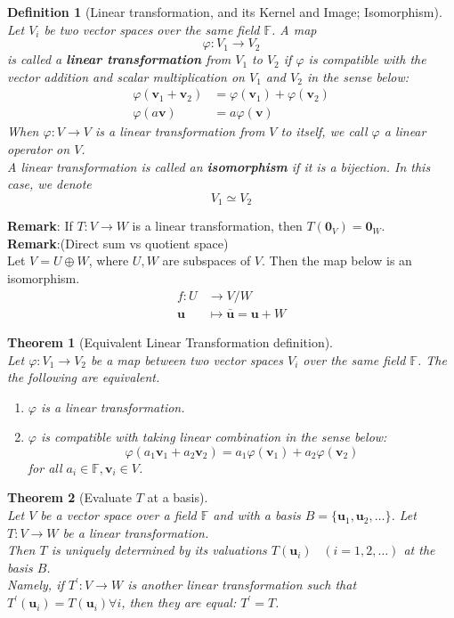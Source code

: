 \documentclass[12pt]{article}
\newtheorem{definition}{Definition}[section]
\newtheorem{theorem}{Theorem}[section]
\theoremstyle{definition}
\begin{document}
\begin{definition}[Linear transformation, and its Kernel and Image; Isomorphism]
\hfill\\\normalfont Let $V_i$ be two vector spaces over the same field $\mathbb{F}$. A map
\[
\varphi:V_1\to V_2
\]
is called a \textbf{linear transformation} from $V_1$ to $V_2$ if $\varphi$ is compatible with the vector addition and scalar multiplication on $V_1$ and $V_2$ in the sense below:
\[
\begin{aligned}
\varphi(\mathbf{v}_1+\mathbf{v}_2)&=\varphi(\mathbf{v}_1)+\varphi(\mathbf{v}_2)\\
\varphi(a\mathbf{v})&=a\varphi(\mathbf{v})
\end{aligned}
\]
When $\varphi:V\to V$ is a linear transformation from $V$ to itself, we call $\varphi$ a linear operator on $V$.\\
A linear transformation is called an \textbf{isomorphism} if it is a bijection. In this case, we denote
\[
V_1\simeq V_2
\]
\end{definition}
\textbf{Remark}: If $T:V\to W$ is a linear transformation, then $T(\mathbf{0}_V)=\mathbf{0}_W$.\\
\textbf{Remark}:(Direct sum vs quotient space)\\
Let $V = U\oplus W$, where $U, W$ are subspaces of $V$. Then the map below is an isomorphism.
\[
\begin{aligned}
f:U&\to V/W\\
\mathbf{u}&\mapsto \bar{\mathbf{u}}=\mathbf{u}+W
\end{aligned}
\]
\begin{theorem}[Equivalent Linear Transformation definition]
\hfill\\\normalfont Let $\varphi:V_1\to V_2$ be a map between two vector spaces $V_i$ over the same field $\mathbb{F}$. The the following are equivalent.
\begin{enumerate}[label=(\arabic*)]
\item $\varphi$ is a linear transformation.
\item $\varphi$ is compatible with taking linear combination in the sense below:
\[
\varphi(a_1\mathbf{v}_1+a_2\mathbf{v}_2)=a_1\varphi(\mathbf{v}_1)+a_2\varphi(\mathbf{v}_2)
\]
for all $a_i\in \mathbb{F},\mathbf{v}_i\in V$.
\end{enumerate}
\end{theorem}
\begin{theorem}[Evaluate $T$ at a basis]
\hfill\\\normalfont Let $V$ be a vector space over a field $\mathbb{F}$ and with a basis $B=\{\mathbf{u}_1,\mathbf{u}_2,\ldots\}$. Let $T:V\to W$ be a linear transformation. \\
Then $T$ is uniquely determined by its valuations $T(\mathbf{u}_i)\;\;\;(i=1,2,\ldots)$ at the basis $B$.\\
Namely, if $T^\prime:V\to W$ is another linear transformation such that $T^\prime(\mathbf{u}_i)=T(\mathbf{u}_i)\forall i$, then they are equal: $T^\prime = T$.
\end{theorem}
\end{document}

